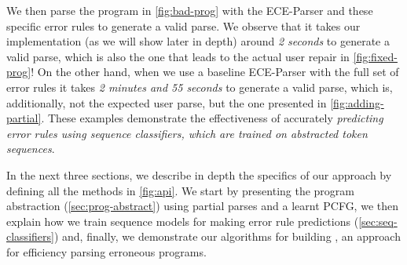 We then parse the program in \autoref{fig:bad-prog} with the ECE-Parser and
these specific error rules to generate a valid parse. We observe that it takes
our implementation (as we will show later in depth) around \emph{2 seconds} to
generate a valid parse, which is also the one that leads to the actual user
repair in \autoref{fig:fixed-prog}! On the other hand, when we use a baseline
ECE-Parser with the full set of error rules it takes \emph{2 minutes and 55
seconds} to generate a valid parse, which is, additionally, not the expected
user parse, but the one presented in \autoref{fig:adding-partial}. These
examples demonstrate the effectiveness of accurately \emph{predicting error
rules using sequence classifiers, which are trained on abstracted token
sequences}.

In the next three sections, we describe in depth the specifics of our approach
by defining all the methods in \autoref{fig:api}. We start by presenting the
program abstraction (\autoref{sec:prog-abstract}) using partial parses and a
learnt PCFG, we then explain how we train sequence models for making error rule
predictions (\autoref{sec:seq-classifiers}) and, finally, we demonstrate our
algorithms for building \toolname, an approach for efficiency parsing erroneous
programs.
